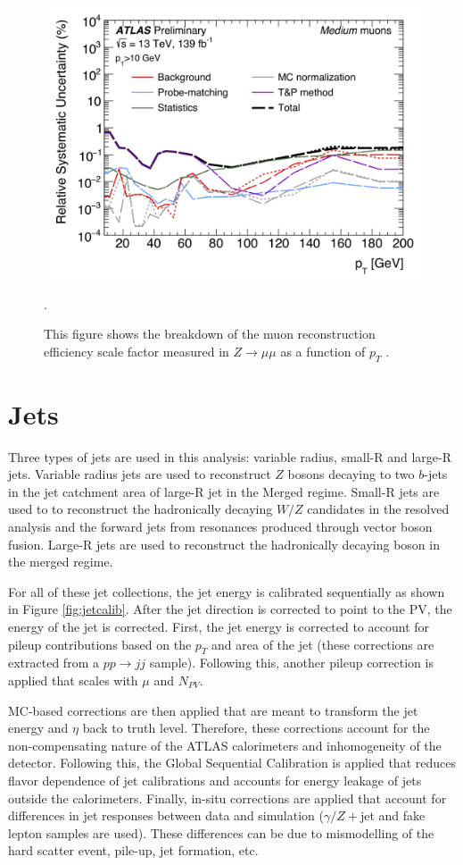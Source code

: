 \begin{figure}[h!]
  \centering
  \includegraphics[width=\hsize]{figures/Analysis/muon_syst.png}
  \caption{{This figure shows the breakdown of the muon reconstruction efficiency scale factor measured in $Z \rightarrow \mu \mu$ as a function of $p_{T}$ \cite{muon_calib}. }}. 
  \label{fig:muon_syst}
\end{figure} 
\FloatBarrier

\section{Jets}
Three types of jets are used in this analysis: variable radius, small-R and large-R jets. Variable radius jets are used to reconstruct $Z$ bosons decaying to two $b$-jets in the jet catchment area of large-R jet in the Merged regime. Small-R jets are used to to reconstruct the hadronically decaying $W/Z$ candidates in the resolved analysis and the forward jets from resonances produced through vector boson fusion. Large-R jets are used to reconstruct the hadronically decaying boson in the merged regime.

For all of these jet collections, the jet energy is calibrated sequentially as shown in Figure \ref{fig:jetcalib}. After the jet direction is corrected to point to the PV, the energy of the jet is corrected. First, the jet energy is corrected to account for pileup contributions based on the $p_{T}$ and area of the jet (these corrections are extracted from a $pp \rightarrow jj$ sample). Following this, another pileup correction is applied that scales with $\mu$ and $N_{PV}$. 

MC-based corrections are then applied that are meant to transform the jet energy and $\eta$ back to truth level. Therefore, these corrections account for the non-compensating nature of the ATLAS calorimeters and inhomogeneity of the detector. Following this, the Global Sequential Calibration is applied that reduces flavor dependence of jet calibrations and accounts for energy leakage of jets outside the calorimeters. Finally, in-situ corrections are applied that account for differences in jet responses between data and simulation ($\gamma /Z+$jet and fake lepton samples are used). These differences can be due to mismodelling of the hard scatter event, pile-up, jet formation, etc. 

